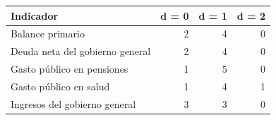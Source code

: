 
\begin{tabular}{lrrr}
\toprule
Indicador & d = 0 & d = 1 & d = 2\\
\midrule
Balance primario & 2 & 4 & 0\\
Deuda neta del gobierno general & 2 & 4 & 0\\
Gasto público en pensiones & 1 & 5 & 0\\
Gasto público en salud & 1 & 4 & 1\\
Ingresos del gobierno general & 3 & 3 & 0\\
\bottomrule
\end{tabular}
